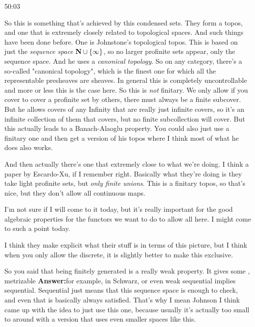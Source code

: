 \begin{example}
\begin{unfinished}{50:03}
\begin{remark}
So this is something that's achieved by this condensed sets. They form a topos, and one that is extremely closely related to topological spaces. And such things have been done before. One is Johnstone's topological topos. This is based on just the \emph{sequence space} $\mathbf N \cup \{\infty\}$, so no larger profinite sets appear, only the sequence space.
And he uses a \emph{canonical topology}. So on any category, there's a so-called "canonical topology", which is the finest one for which all the representable presheaves are sheaves. %
In general this is completely uncontrollable and more or less this is the case here. So this is \emph{not} finitary. We only allow if you cover to cover a  profinite set by others, there must always be a finite subcover. But he allows covers of any 
Infinity that are really just infinite covers, so it's an infinite collection of them that covers, but no finite subcollection will cover. But this actually leads to a Banach-Alaoglu property.
You could also just use a finitary one and then get a version of his topos where I think most of what he does also works. 

And then actually there's one that extremely close to what we're doing. I think a paper by Escardo-Xu, if I remember right. Basically what they're doing is they take light profinite sets, but \emph{only finite unions}. This is a finitary topos, so that's nice, but they don't allow all continuous maps.

I'm not sure if I will come to it today, but it's really important for the good algebraic properties for the functors we want to do to allow all here. I might come to such a point today.

I think they make explicit what their stuff is in terms of this picture, but I think when you only allow the discrete, it is slightly better to make this exclusive.

So you said that being finitely generated is a really weak property. It gives some , 
metrizable
\textbf{Answer:}for example, in Schwarz, or even weak sequential implies sequential. Sequential just means that this sequence space is enough to check, and even that is basically always satisfied. That's why I mean Johnson I think came up with the idea to just use this one, because usually it's actually too small to around with a version that uses even smaller spaces like this.


\end{remark}
\end{unfinished}
\end{example}
